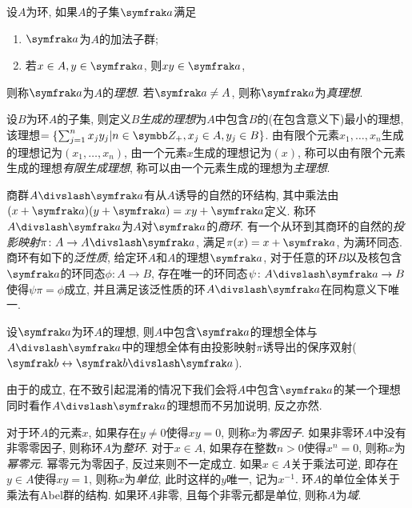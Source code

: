 设$A$为环, 如果$A$的子集$\ideal{a}$满足
\begin{enumerate}
    \item $\ideal{a}$为$A$的加法子群;
    \item 若$x\in A, y\in\ideal{a}$, 则$xy\in\ideal{a}$,
\end{enumerate}
则称$\ideal{a}$为$A$的\emph{理想}. 若$\ideal{a}\neq A$, 则称$\ideal{a}$为\emph{真理想}.

设$B$为环$A$的子集, 则定义\emph{$B$生成的理想}为$A$中包含$B$的(在包含意义下)最小的理想, 该理想$=\{\sum_{j=1}^n x_jy_j\vert n\in\ZZ_+, x_j\in A, y_j\in B\}$. 由有限个元素$x_1, \dotsc, x_n$生成的理想记为$(x_1, \dotsc, x_n)$, 由一个元素$x$生成的理想记为$(x)$, 称可以由有限个元素生成的理想\emph{有限生成理想}, 称可以由一个元素生成的理想为\emph{主理想}.

商群$A{\divslash} \ideal{a}$有从$A$诱导的自然的环结构, 其中乘法由$(x+\ideal{a})(y+\ideal{a})=xy+\ideal{a}$定义. 称环$A{\divslash}\ideal{a}$为$A$对$\ideal{a}$的\emph{商环}. 有一个从环到其商环的自然的\emph{投影映射}$\pi\colon A\to A{\divslash}\ideal{a}$, 满足$\pi(x)=x+\ideal{a}$, 为满环同态. 商环有如下的\emph{泛性质}\parencite[5]{altman_term_2017}, 给定环$A$和$A$的理想$\ideal{a}$, 对于任意的环$B$以及核包含$\ideal{a}$的环同态$\phi\colon A\to B$, 存在唯一的环同态$\psi\colon A{\divslash}\ideal{a}\to B$使得$\psi\pi=\phi$成立, 并且满足该泛性质的环$A{\divslash}\ideal{a}$在同构意义下唯一.

\begin{proposition}\label{prop:quotidealcorr}
    设$\ideal{a}$为环$A$的理想, 则$A$中包含$\ideal{a}$的理想全体与$A{\divslash}\ideal{a}$中的理想全体有由投影映射$\pi$诱导出的保序双射($\ideal{b}\leftrightarrow\ideal{b}{\divslash}\ideal{a}$).
\end{proposition}

\begin{remark}
    由于的成立, 在不致引起混淆的情况下我们会将$A$中包含$\ideal{a}$的某一个理想同时看作$A{\divslash}\ideal{a}$的理想而不另加说明, 反之亦然.
\end{remark}

对于环$A$的元素$x$, 如果存在$y\neq 0$使得$xy=0$, 则称$x$为\emph{零因子}. 如果非零环$A$中没有非零零因子, 则称环$A$为\emph{整环}. 对于$x\in A$, 如果存在整数$n>0$使得$x^n = 0$, 则称$x$为\emph{幂零元}. 幂零元为零因子, 反过来则不一定成立. 如果$x\in A$关于乘法可逆, 即存在$y\in A$使得$xy=1$, 则称$x$为\emph{单位}, 此时这样的$y$唯一, 记为$x^{-1}$. 环$A$的单位全体关于乘法有Abel群的结构. 如果环$A$非零, 且每个非零元都是单位, 则称$A$为\emph{域}.

